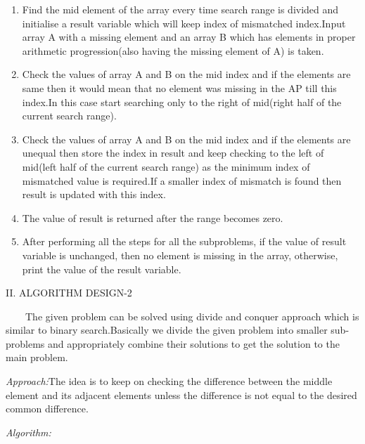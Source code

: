 \documentclass[12pt,a4paper]{article}
\begin{document}
\begin{multicols}{2}
\begin{enumerate}
\item Find the mid element of the array every time search range is divided and initialise a result variable which will keep index of mismatched index.Input array A with a missing element and an array B which has elements in proper arithmetic progression(also having the missing element of A) is taken.
\item Check the values of array A and B on the mid index and if the elements are same then it would mean that no element was missing in the AP till this index.In this case start searching only to the right of mid(right half of the current search range).
\item Check the values of array A and B on the mid index and if the elements are unequal then store the index in result and keep checking to the left of mid(left half of the current search range) as the minimum index of mismatched value is required.If a smaller index of mismatch is found then result is updated with this index.
\item The value of result is returned after the range becomes zero.
\item After performing all the steps for all the subproblems, if the value of result variable is unchanged, then no element is missing in the array, otherwise, print the value of the result variable.
\setcounter{numberedCntA}{\theenumi}
\end{enumerate}

\begin{center}II. ALGORITHM DESIGN-2\end{center}

\ \ \ \ The given problem can be solved using divide and conquer approach which is similar to binary search.Basically we divide the given problem into smaller sub-problems and appropriately combine their solutions to get the solution to the main problem.  


\textit{  Approach:}The idea is to keep on checking the difference between the middle element and its adjacent elements unless the difference is not equal to the desired common difference.


\textit{  Algorithm:}


\end{multicols}
\end{document}

